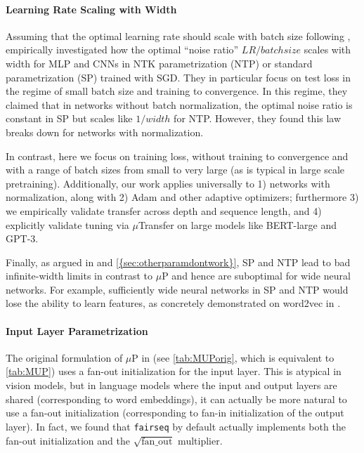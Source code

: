 \documentclass{article}
\theoremstyle{definition}
\newcommand{\fanout}{\mathrm{fan\_out}}
\begin{document}
\paragraph{Learning Rate Scaling with Width}

Assuming that the optimal learning rate should scale with batch size following \citep{smith_dont_2017}, \citep{park_effect_2019}
empirically investigated how the optimal ``noise ratio'' $LR/batchsize$ scales with width for MLP and CNNs in NTK parametrization (NTP) or standard parametrization (SP) trained with SGD.
They in particular focus on test loss in the regime of small batch size and training to convergence.
In this regime, they claimed that in networks without batch normalization, the optimal noise ratio is constant in SP but scales like $1/width$ for NTP.
However, they found this law breaks down for networks with normalization.

In contrast, here we focus on training loss, without training to convergence and with a range of batch sizes from small to very large (as is typical in large scale pretraining).
Additionally, our work applies universally to 1) networks with normalization, along with 2) Adam and other adaptive optimizers; furthermore 3) we empirically validate transfer across depth and sequence length, and 4) explicitly validate tuning via $\mu$Transfer on large models like BERT-large and GPT-3.

Finally, as argued in \citep{TP4} and \cref{{sec:otherparamdontwork}}, SP and NTP lead to bad infinite-width limits in contrast to $\mu$P and hence are suboptimal for wide neural networks.
For example, sufficiently wide neural networks in SP and NTP would lose the ability to learn features, as concretely demonstrated on word2vec in \citep{TP4}.

\paragraph{Input Layer Parametrization}
The original formulation of $\mu$P in \citep{TP4} (see \cref{tab:MUPorig}, which is equivalent to \cref{tab:MUP}) uses a fan-out initialization for the input layer.
This is atypical in vision models, but in language models where the input and output layers are shared (corresponding to word embeddings), it can actually be more natural to use a fan-out initialization (corresponding to fan-in initialization of the output layer).
In fact, we found that \texttt{fairseq} \citep{ott2019fairseq} by default actually implements both the fan-out initialization and the $\sqrt{\fanout}$ multiplier.%
\end{document}
